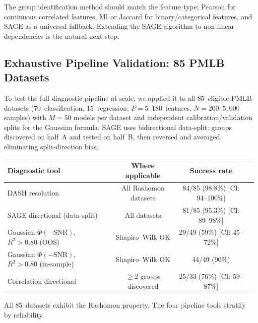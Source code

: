 \documentclass[11pt,a4paper]{article}
\begin{document}
The group identification method should match the feature type: Pearson for continuous correlated features, MI or Jaccard for binary/categorical features, and SAGE as a universal fallback. Extending the SAGE algorithm to non-linear dependencies is the natural next step.

\subsection{Exhaustive Pipeline Validation: 85 PMLB Datasets}
\label{sec:massive-validation}

To test the full diagnostic pipeline at scale, we applied it to all
85~eligible PMLB datasets (70~classification, 15~regression;
$P = 5$--$180$~features, $N = 200$--$5{,}000$ samples) with $M = 50$
models per dataset and independent calibration/validation splits for
the Gaussian formula.  SAGE uses bidirectional data-split: groups
discovered on half~A and tested on half~B, then reversed and averaged,
eliminating split-direction bias.

\begin{center}
\small
\begin{tabular}{lccc}
\toprule
Diagnostic tool & Where applicable & Success rate \\
\midrule
DASH resolution & All Rashomon datasets & 84/85 (98.8\%) [CI: 94--100\%] \\
SAGE directional (data-split) & All datasets & 81/85 (95.3\%) [CI: 89--98\%] \\
Gaussian $\Phi(-\text{SNR})$, $R^2 > 0.80$ (OOS) & Shapiro--Wilk OK & 29/49 (59\%) [CI: 45--72\%] \\
Gaussian $\Phi(-\text{SNR})$, $R^2 > 0.80$ (in-sample) & Shapiro--Wilk OK & 44/49 (90\%) \\
Correlation directional & $\geq 2$ groups discovered & 25/33 (76\%) [CI: 59--87\%] \\
\bottomrule
\end{tabular}
\end{center}

All 85~datasets exhibit the Rashomon property.  The four pipeline tools
stratify by reliability.
\end{document}
